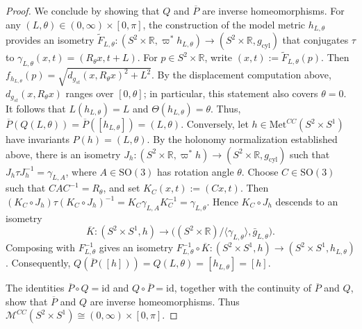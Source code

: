 \documentclass[10pt,a4paper]{amsart}
\begin{document}
\begin{proof}
We conclude by showing that $Q$ and $\overline P$ are inverse homeomorphisms.
For any $(L,\theta)\in(0,\infty)\times[0,\pi]$, the construction of the
model metric $h_{L,\theta}$ provides an isometry
\(\widetilde F_{L,\theta}\colon
(S^2\times\mathbb R,\varpi^*h_{L,\theta})
\to (S^2\times\mathbb R,g_{\mathrm{cyl}})\)
that conjugates $\tau$ to
$\gamma_{L,\theta}(x,t)=(R_\theta x,t+L)$. For
$p\in S^2\times\mathbb R$, write
\(
(x,t):=\widetilde F_{L,\theta}(p).
\)
Then
\(f_{h_{L,\theta}}(p)
=\sqrt{d_{g_{st}}(x,R_\theta x)^2+L^2}\).
By the displacement computation above,
$d_{g_{st}}(x,R_\theta x)$ ranges over $[0,\theta]$; in particular, this
statement also covers $\theta=0$. It follows that
$L(h_{L,\theta})=L$ and $\Theta(h_{L,\theta})=\theta$. Thus,
\(\overline P(Q(L, \theta)) = \overline P([h_{L, \theta}]) = (L, \theta)\).
Conversely, let $h\in\mathrm{Met}^{CC}(S^2\times S^1)$ have invariants
$P(h)=(L,\theta)$. By the holonomy normalization established above, there is
an isometry
\(J_h\colon(S^2\times\mathbb R,\varpi^*h)
\to (S^2\times\mathbb R,g_{\mathrm{cyl}})\)
such that $J_h\tau J_h^{-1}=\gamma_{L,A}$, where $A\in\mathrm{SO}(3)$
has rotation angle $\theta$. Choose $C\in\mathrm{SO}(3)$ such that
$CAC^{-1}=R_\theta$, and set $K_C(x,t):=(Cx,t)$. Then
\((K_C\circ J_h)\tau(K_C\circ J_h)^{-1}
=K_C\gamma_{L,A}K_C^{-1}=\gamma_{L,\theta}\).
Hence $K_C\circ J_h$ descends to an isometry
\[
\overline K\colon
(S^2\times S^1,h)
\longrightarrow
\bigl((S^2\times\mathbb R)/\langle\gamma_{L,\theta}\rangle,
\bar g_{L,\theta}\bigr).
\]
Composing with $F_{L,\theta}^{-1}$ gives an isometry
\(F_{L,\theta}^{-1}\circ\overline K\colon
(S^2\times S^1,h)
\to (S^2\times S^1,h_{L,\theta})\).
Consequently,
\(Q(\overline P([h]))=Q(L,\theta)=[h_{L,\theta}]=[h]\).

The identities $\overline P\circ Q=\mathrm{id}$ and
$Q\circ\overline P=\mathrm{id}$, together with the continuity of $\overline P$
and $Q$,
show that $\overline P$ and $Q$ are inverse homeomorphisms. Thus
\(\mathcal{M}^{CC}(S^2\times S^1)\cong(0,\infty)\times[0,\pi]\).
\end{proof}
\end{document}
